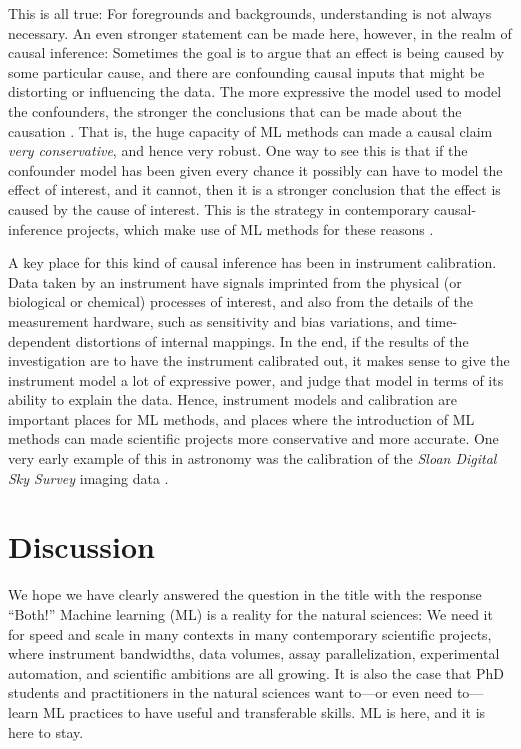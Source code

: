 \documentclass[10pt]{article}
\begin{document}
This is all true: For foregrounds and backgrounds, understanding is not always necessary.
An even stronger statement can be made here, however, in the realm of causal inference:
Sometimes the goal is to argue that an effect is being caused by some particular cause, and there are confounding causal inputs that might be distorting or influencing the data.
The more expressive the model used to model the confounders, the stronger the conclusions that can be made about the causation \cite{causal_inference}.
That is, the huge capacity of ML methods can made a causal claim \emph{very conservative}, and hence very robust.
One way to see this is that if the confounder model has been given every chance it possibly can have to model the effect of interest, and it cannot, then it is a stronger conclusion that the effect is caused by the cause of interest.
This is the strategy in contemporary causal-inference projects, which make use of ML methods for these reasons \cite{bart}.

A key place for this kind of causal inference has been in instrument calibration.
Data taken by an instrument have signals imprinted from the physical (or biological or chemical) processes of interest, and also from the details of the measurement hardware, such as sensitivity and bias variations, and time-dependent distortions of internal mappings.
In the end, if the results of the investigation are to have the instrument calibrated out, it makes sense to give the instrument model a lot of expressive power, and judge that model in terms of its ability to explain the data.
Hence, instrument models and calibration are important places for ML methods, and places where the introduction of ML methods can made scientific projects more conservative and more accurate.
One very early example of this in astronomy was the calibration of the \textsl{Sloan Digital Sky Survey} imaging data \cite{ubercalibration}.

\section{Discussion}\label{sec:discussion}

We hope we have clearly answered the question in the title with the response ``Both!''
Machine learning (ML) is a reality for the natural sciences:
We need it for speed and scale in many contexts in many contemporary scientific projects, where instrument bandwidths, data volumes, assay parallelization, experimental automation, and scientific ambitions are all growing.
It is also the case that PhD students and practitioners in the natural sciences want to---or even need to---learn ML practices to have useful and transferable skills.
ML is here, and it is here to stay.
\end{document}
